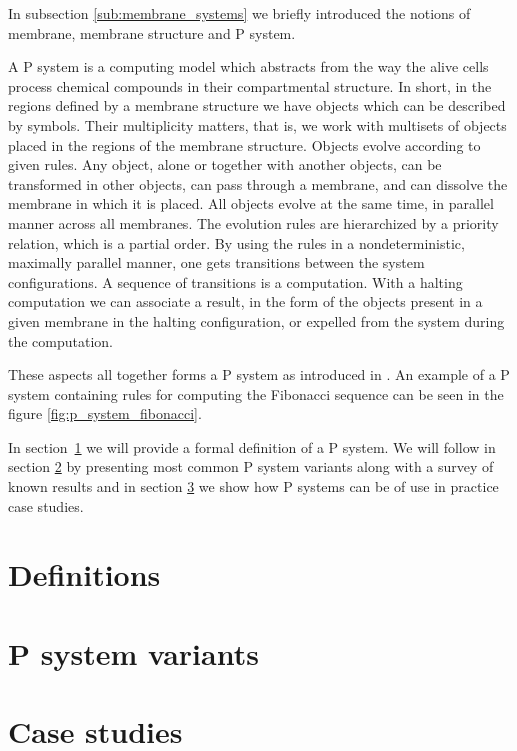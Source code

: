 In subsection \ref{sub:membrane_systems} we briefly introduced the notions of membrane, membrane structure and P system.

A P system \cite{Paun98} is a computing model which abstracts from the way the alive cells process chemical compounds in their compartmental structure. In short, in the regions defined by a membrane structure we have objects which can be described by symbols. Their multiplicity matters, that is, we work with multisets of objects placed in the regions of the membrane structure. Objects evolve according to given rules. Any object, alone or together with another objects, can be transformed in other objects, can pass through a membrane, and can dissolve the membrane in which it is placed. All objects evolve at the same time, in parallel manner across all membranes. The evolution rules are hierarchized by a priority relation, which is a partial order. By using the rules in a nondeterministic, maximally parallel manner, one gets transitions between the system configurations. A sequence of transitions is a computation. With a halting computation we can associate a result, in the form of the objects present in a given membrane in the halting configuration, or expelled from the system during the computation.


These aspects all together forms a P system as introduced in \cite{Paun98}. An example of a P system containing rules for computing the Fibonacci sequence can be seen in the figure \ref{fig:p_system_fibonacci}.

In section~\ref{sec:definitions} we will provide a formal definition of a P system. We will follow in section \ref{sec:p_system_variants} by presenting most common P system variants along with a survey of known results and in section \ref{sec:case_studies} we show how P systems can be of use in practice case studies.

\section{Definitions} %
\label{sec:definitions}



\section{P system variants} %
\label{sec:p_system_variants}



\section{Case studies} %
\label{sec:case_studies}



